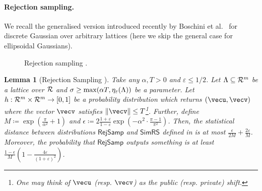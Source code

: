 \documentclass[11pt,letterpaper]{article}
\newcounter{theo}[section]
\newtheorem{lemma}[theorem]{Lemma}
\theoremstyle{definition} %
\begin{document}
\paragraph{Rejection sampling.} We recall the generalised version introduced recently by Boschini et al.\ \cite{DBLP:conf/crypto/BoschiniTT22} for discrete Gaussian over arbitrary lattices (here we skip the general case for ellipsoidal Gaussians).
\begin{figure}[t]
				\centering
				\caption{Rejection sampling \cite{DBLP:conf/crypto/BoschiniTT22}.}
				\label{fig:rejsamp}
			\end{figure}
\begin{lemma}[Rejection Sampling \cite{DBLP:conf/crypto/BoschiniTT22}]
	\label{lem:rejsamp}
	Take any $\alpha, T>0$ and $\varepsilon \leq 1/2$. Let $\Lambda \subseteq \mathcal{R}^m$ be a lattice over $\mathcal{R}$ and $\sigma \geq \max(\alpha T, \eta_{\varepsilon}(\Lambda))$ be a parameter. Let $h: \mathcal{R}^m \times \mathcal{R}^m \rightarrow [0,1]$ be a probability distribution which returns $(\vecu,\vecv)$ where the vector $\vecv$ satisfies $\|\vecv\| \leq T$\footnote{One may think of $\vecu$ (resp. $\vecv$) as the public (resp. private) shift.}. Further, define $M \coloneqq  \exp(\frac{\pi}{\alpha^2} + 1)$ and $\epsilon \coloneqq  2\frac{1+\varepsilon}{1-\varepsilon}\exp(-\alpha^2 \cdot \frac{\pi-1}{\pi^2})$. Then, the statistical distance between distributions $\mathsf{RejSamp}$ and $\mathsf{SimRS}$ defined in  is at most $\frac{\epsilon}{2M} + \frac{2\varepsilon}{M}$. Moreover, the probability that $\mathsf{RejSamp}$ outputs something is at least $\frac{1-\epsilon}{M}\left(1-\frac{4\varepsilon}{(1+\varepsilon)^2}\right)$.
\end{lemma}
\end{document}
